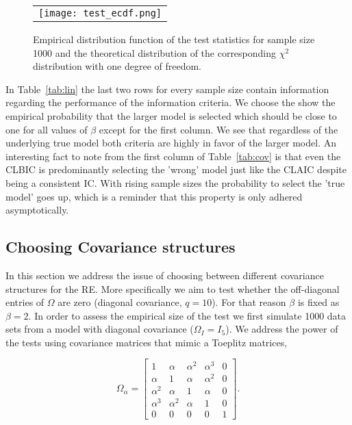 \documentclass[12pt, a4paper]{article}
\numberwithin{defcounter}{section}
\numberwithin{excounter}{section}
\begin{document}
\begin{figure}%
{\caption{Empirical distribution function of the test statistics for sample size 1000 and the theoretical distribution of the corresponding $\chi^2$ distribution with one degree of freedom.}
\label{fig:ecdf}}%
\begin{tabular}{@{}r@{}} 
\texttt{[image: test\_ecdf.png]}\\
\end{tabular}
\end{figure}

In Table~\ref{tab:lin} the last two rows for every sample size contain information regarding the performance of the information criteria. We choose the show the empirical probability that the larger model is selected which should be close to one for all values of $\beta$ except for the first column. We see that regardless of the underlying true model both criteria are highly in favor of the larger model. An interesting fact to note from the first column of Table~\ref{tab:cov} is that even the \ac{CLBIC}  is predominantly selecting the 'wrong' model just like the \ac{CLAIC} despite being a consistent \ac{IC}. With rising sample sizes the probability to select the 'true model' goes up, which is a reminder that this property is only adhered asymptotically.


\subsection{Choosing Covariance structures}

\label{chap:cov}
In this section we address the issue of choosing between different covariance structures for the \ac{RE}. More specifically we aim to test whether the off-diagonal entries of $\Omega$ are zero (diagonal covariance, $q=10$). For that reason $\beta$ is fixed as $\beta = 2$. In order to assess the empirical size of the test we first simulate 1000 data sets from a model with diagonal covariance ($\Omega_{I} = I_5$). We address the power of the tests using covariance matrices that mimic a Toeplitz matrices,


\begin{equation*}
\Omega_{\alpha} =
\begin{bmatrix}
 1 & \alpha & \alpha^2 & \alpha^3 & 0\\
\alpha & 1 & \alpha & \alpha^2 & 0\\
\alpha^2 & \alpha & 1 & \alpha & 0\\
\alpha^3 & \alpha^2 & \alpha & 1 &0\\
0& 0 & 0 & 0 & 1
\end{bmatrix}.
\end{equation*}
\end{document}
